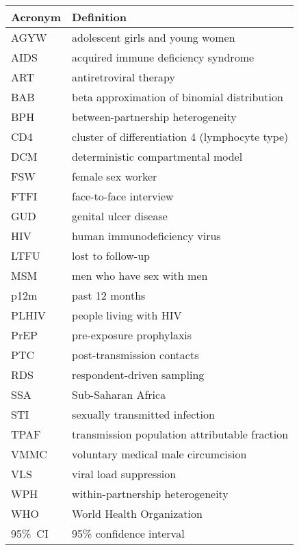\begin{tabular}{ll}
  \toprule
  Acronym & Definition \\
  \midrule
  AGYW    & adolescent girls and young women \\
  AIDS    & acquired immune deficiency syndrome \\
  ART     & antiretroviral therapy \\
  BAB     & beta approximation of binomial distribution \\
  BPH     & between-partnership heterogeneity \\
  CD4     & cluster of differentiation 4 (lymphocyte type) \\
  DCM     & deterministic compartmental model \\
  FSW     & female sex worker \\
  FTFI    & face-to-face interview \\
  GUD     & genital ulcer disease \\
  HIV     & human immunodeficiency virus \\
  LTFU    & lost to follow-up \\
  MSM     & men who have sex with men \\
  p12m    & past 12 months \\
  PLHIV   & people living with HIV \\
  PrEP    & pre-exposure prophylaxis \\
  PTC     & post-transmission contacts \\
  RDS     & respondent-driven sampling \\
  SSA     & Sub-Saharan Africa \\
  STI     & sexually transmitted infection \\
  TPAF    & transmission population attributable fraction \\
  VMMC    & voluntary medical male circumcision \\
  VLS     & viral load suppression \\
  WPH     & within-partnership heterogeneity \\
  WHO     & World Health Organization \\
  95\%~CI & 95\% confidence interval \\
  \bottomrule
\end{tabular}